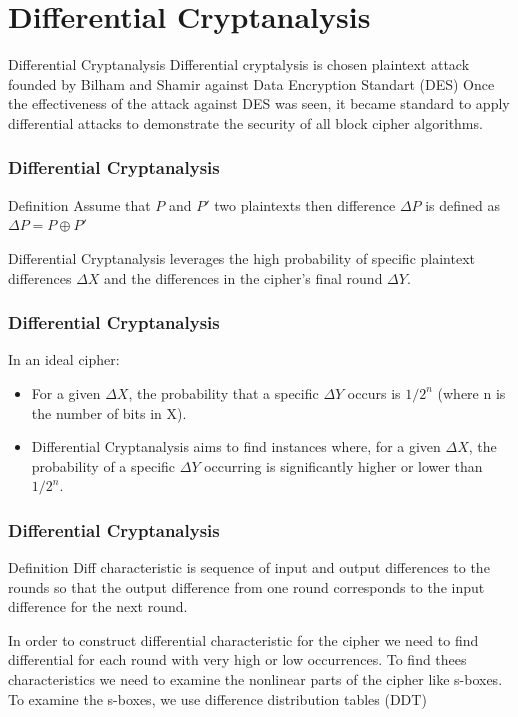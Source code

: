 \documentclass{beamer}
\begin{document}
\section{Differential Cryptanalysis}
\begin{frame}{Differential Cryptanalysis}
    Differential cryptalysis is chosen plaintext attack founded by Bilham and Shamir
against Data Encryption Standart (DES) Once the effectiveness of the attack against
DES was seen, it became standard to apply differential attacks to demonstrate the
security of all block cipher algorithms.
\end{frame}
\begin{frame}
\frametitle{Differential Cryptanalysis}

\begin{block}{Definition}
Assume that $P$ and $P'$ two plaintexts then difference $\Delta P$ is defined as 
  $ \Delta P = P \oplus P' $
\end{block}

Differential Cryptanalysis leverages the high probability of specific plaintext differences $\Delta X$ and the differences in the cipher's final round $\Delta Y$. 
\end{frame}
\begin{frame}
\frametitle{Differential Cryptanalysis}

 In an ideal cipher:
\begin{itemize}

    \item For a given $\Delta X$, the probability that a specific $\Delta Y$ occurs is $1/2^n$ (where n is the number of bits in X).

    \item Differential Cryptanalysis aims to find instances where, for a given $\Delta X$, the probability of a specific $\Delta Y$ occurring is significantly higher or lower than $1/2^n$.
    
\end{itemize}
\end{frame}
\begin{frame}
\frametitle{Differential Cryptanalysis}

    \begin{block}{Definition}
    Diff characteristic is sequence of input and output differences to the rounds so that the output difference from one round corresponds to the input difference for the next round.
    \end{block}
    
    \vspace{1 em}
    In order to construct differential characteristic for the cipher we need to find differential for each round with very high or low occurrences. To find thees characteristics we need to examine the nonlinear parts of the cipher like s-boxes. To examine the s-boxes, we use difference distribution tables (DDT)
    
\end{frame}
\end{document}
